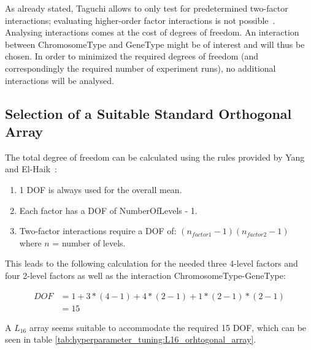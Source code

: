 As already stated, Taguchi allows to only test for predetermined two-factor interactions; evaluating higher-order factor interactions is not possible~\cite{yang_design_2009}. Analysing interactions comes at the cost of degrees of freedom. An interaction between ChromosomeType and GeneType might be of interest and will thus be chosen. In order to minimized the required degrees of freedom (and correspondingly the required number of experiment runs), no additional interactions will be analysed.

\subsection{Selection of a Suitable Standard Orthogonal Array}
\label{sect:hyperparameter_tuning:selection_orthogonal_array}
The total degree of freedom can be calculated using the rules provided by Yang and El-Haik~\cite{yang_design_2009}:

\begin{enumerate}
	\item 1 DOF is always used for the overall mean. 
	\item Each factor has a DOF of NumberOfLevels - 1.
	\item Two-factor interactions require a DOF of: $(n_{factor1} - 1)(n_{factor2} - 1)$ where $n$ = number of levels.
\end{enumerate}

This leads to the following calculation for the needed three 4-level factors and four 2-level factors as well as the interaction ChromosomeType-GeneType:

\begin{equation}
	\begin{split}
		DOF & = 1 + 3 * (4 - 1) + 4 * (2 - 1) + 1 * (2 - 1) * (2 - 1) \\
		& = 15
	\end{split}
	 \label{equ:hyperparam_tuning:DOF}
\end{equation}

A $L_{16}$ array seems suitable to accommodate the required 15 DOF, which can be seen in table \ref{tab:hyperparameter_tuning:L16_orhtogonal_array}.

